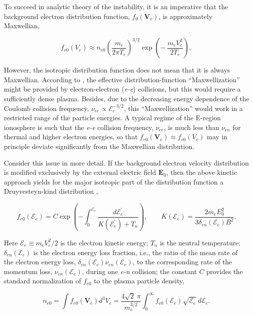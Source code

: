 \documentclass[draft]{agujournal2019}
\renewcommand{\vec}{\mathbf}
\begin{document}
To succeed in analytic theory of the instability, it is an imperative that the background electron 
distribution function, $f_{0}(\vec{V}_{e})$, is approximately Maxwellian, 
\begin{linenomath*}
\begin{equation}
f_{e0}(V_{e})\approx n_{e0}\left(  \frac{m_{e}}{2\pi T_{e}}\right)  ^{3/2}%
\exp\left(  -\ \frac{m_{e}V_{e}^{2}}{2T_{e}}\right), 
\label{e_Maxwellian}
\end{equation}
\end{linenomath*}
However, the isotropic distribution function does not mean that it is always Maxwellian. 
According to , the effective distribution-function ``Maxwellization'' 
might be provided by electron-electron (\emph{e-e}) collisions, 
but this would require a sufficiently dense plasma. Besides, due to the decreasing energy dependence 
of the Coulomb collision frequency, $\nu_{ee}\propto \mathcal{E}_{e}^{-3/2}$, 
this ``Maxwellization'' would work in a restricted range of the particle energies. 
A typical regime of the E-region ionosphere is such that the \emph{e-e} collision frequency, $\nu_{ee}$, 
is much less than $\nu_{en}$ for thermal and higher electron energies, so that
$f_{e0}(\vec{V}_{e})\approx f_{e0}(V_{e})$ may in principle deviate significantly from the Maxwellian distribution. 


Consider this issue in more detail. If the background electron velocity 
distribution is modified exclusively by the external electric field $\vec
{E}_{0}$, then the above kinetic approach yields for the major isotropic part of the distribution function
a Druyvesteyn-kind distribution \cite{Gurevich:Nonlinear78},
\begin{linenomath*}
\begin{equation}
f_{e0}(\mathcal{E}_{e})=C\exp\left(  -\int_{0}^{\mathcal{E}_{e}}\frac
{d\mathcal{E}_{e}^{\prime}}{K(\mathcal{E}_{e}^{\prime})+T_{n}}\right)  ,\qquad
K(\mathcal{E}_{e})=\frac{2m_{e}E_{0}^{2}}{3\delta_{en}(\mathcal{E}_{e})B^{2}}.
\label{Druyvesteyn_2}%
\end{equation}
\end{linenomath*}
Here $\mathcal{E}_{e}\equiv m_{e}V_{e}^{2}/2$ is the electron kinetic energy;
$T_{n}$ is the neutral temperature; $\delta_{en}(\mathcal{E}_{e})$ is the electron energy loss fraction, i.e., the
ratio of the mean rate of the electron energy loss, $\delta_{en}(\mathcal{E}_{e})\nu_{en}(\mathcal{E}_{e})$, 
to the corresponding rate of the momentum loss, $\nu_{en}(\mathcal{E}_{e})$, during one \emph{e-n} collision; the constant $C$ provides
the standard normalization of $f_{e0}$ to the plasma particle density,
\begin{linenomath*}
\[
n_{e0}=\int f_{e0}(\vec{V}_{e})d^{3}V_{e} = \frac{4\sqrt{2}\ \pi}{m_{e}^{3/2}%
}\int_{0}^{\infty}f_{e0}(\mathcal{E}_{e})\sqrt{\mathcal{E}_{e}}\ d\mathcal{E}%
_{e}.
\]
\end{linenomath*}
\end{document}
